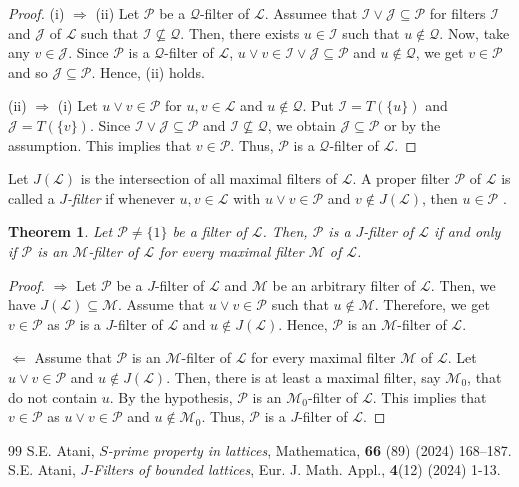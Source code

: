 \documentclass[10pt,a4paper]{amsart}
\newtheorem{theorem}{Theorem}[section]
\numberwithin{equation}{section}
\begin{document}
\begin{proof}
(i) $\Longrightarrow$ (ii) Let $\mathcal{P}$ be a  $\mathcal{Q}$-filter of $\mathcal{L}$. Assumee that $\mathcal{I} \vee \mathcal{J} \subseteq \mathcal{P}$ for filters  $\mathcal{I}$ and $\mathcal{J}$  of $\mathcal{L}$ such that $\mathcal{I}  \nsubseteq  \mathcal{Q}$. Then, there exists $u \in \mathcal{I}$ such that $ u \notin  \mathcal{Q}$. Now, take any $v \in \mathcal{J}$.  Since  $\mathcal{P}$ is a  $\mathcal{Q}$-filter of $\mathcal{L}$, $ u \vee v \in \mathcal{I} \vee \mathcal{J} \subseteq \mathcal{P}$ and $u \notin \mathcal{Q}$, we get  $v \in \mathcal{P}$ and so $\mathcal{J}  \subseteq \mathcal{P} $.   Hence, (ii) holds.

(ii) $\Longrightarrow$ (i) Let $u \vee v \in \mathcal{P}$ for $u,v \in \mathcal{L}$ and $u \notin \mathcal{Q}$. Put $\mathcal{I}=T(\{u\})$ and $\mathcal{J}=T(\{v\})$.   Since  $\mathcal{I} \vee \mathcal{J} \subseteq \mathcal{P}$ and $\mathcal{I} \nsubseteq \mathcal{Q}$, we obtain $\mathcal{J} \subseteq \mathcal{P}$ or  by the assumption. This implies that $v \in \mathcal{P}$. Thus, $\mathcal{P}$ is a $\mathcal{Q}$-filter of $\mathcal{L}$.
\end{proof}

Let $J(\mathcal{L})$ is the intersection of all maximal filters of $\mathcal{L}$. A proper ﬁlter $\mathcal{P}$ of $\mathcal{L}$ is called a {\it $J$-ﬁlter} if whenever $u,v \in \mathcal{L}$ with $u \vee v \in \mathcal{P}$ and $v \notin J(\mathcal{L})$, then $u \in \mathcal{P}$ \cite{Atani6}.
\begin{theorem} \label{3}
Let $\mathcal{P} \neq \{1\}$ be   a filter of $\mathcal{L}$.  Then,  $\mathcal{P}$ is a  $J$-filter of $\mathcal{L}$ if and only if  $\mathcal{P}$ is an  $\mathcal{M}$-filter of $\mathcal{L}$ for every maximal filter $\mathcal{M}$ of $\mathcal{L}$.
\end{theorem}
\begin{proof}
$\Longrightarrow$ Let $\mathcal{P}$ be a  $J$-filter of $\mathcal{L}$ and $\mathcal{M}$ be an arbitrary filter of $\mathcal{L}$. Then,   we have $J(\mathcal{L}) \subseteq \mathcal{M}$. Assume that $u \vee v \in \mathcal{P}$ such that $ u \notin \mathcal{M}$. Therefore, we get  $v \in  \mathcal{P}$ as $\mathcal{P}$ is a  $J$-filter of $\mathcal{L}$ and $u \notin  J(\mathcal{L})$. Hence, $\mathcal{P}$ is an  $\mathcal{M}$-filter of $\mathcal{L}$.

$\Longleftarrow$ Assume that $\mathcal{P}$ is an  $\mathcal{M}$-filter of $\mathcal{L}$ for every maximal filter $\mathcal{M}$ of $\mathcal{L}$. Let $u \vee v \in \mathcal{P}$ and $u \notin J(\mathcal{L})$. Then, there is at least a maximal  filter, say $\mathcal{M}_0$,  that do not contain $u$.  By the hypothesis, $\mathcal{P}$ is an  $\mathcal{M}_0$-filter of $\mathcal{L}$. This implies that   $v \in \mathcal{P}$ as $u \vee v \in \mathcal{P}$ and $u \notin \mathcal{M}_0$. Thus, $\mathcal{P}$ is a  $J$-filter of $\mathcal{L}$.
\end{proof}

\begin{thebibliography}{99}
 S.E. Atani, {\it $S$-prime property in lattices}, Mathematica, {\bf 66} (89) (2024) 168–187.
 S.E. Atani, {\it $J$-Filters of bounded lattices}, Eur. J. Math. Appl., {\bf 4}(12) (2024) 1-13.
\end{thebibliography}
\end{document}
